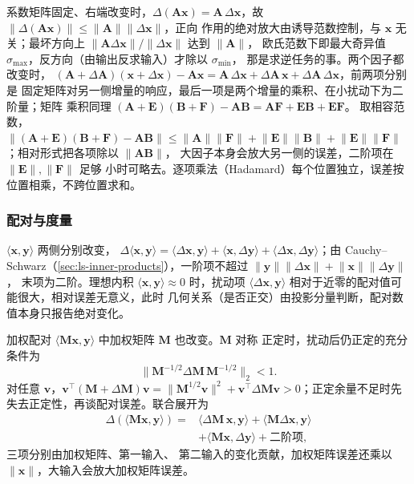 系数矩阵固定、右端改变时，$\Delta(\bm A\bm x)=\bm A\,\Delta\bm x$，故
$\lVert\Delta(\bm A\bm x)\rVert\leq\lVert\bm A\rVert\lVert\Delta\bm x\rVert$，正向
作用的绝对放大由诱导范数控制，与 $\bm x$ 无关；最坏方向上
$\lVert\bm A\Delta\bm x\rVert/\lVert\Delta\bm x\rVert$ 达到 $\lVert\bm A\rVert$，
欧氏范数下即最大奇异值 $\sigma_{\max}$，反方向（由输出反求输入）才除以 $\sigma_{\min}$，
那是求逆任务的事。两个因子都改变时，
$(\bm A+\Delta\bm A)(\bm x+\Delta\bm x)-\bm A\bm x
=\bm A\,\Delta\bm x+\Delta\bm A\,\bm x+\Delta\bm A\,\Delta\bm x$，前两项分别是
固定矩阵对另一侧增量的响应，最后一项是两个增量的乘积、在小扰动下为二阶量；矩阵
乘积同理 $(\bm A+\bm E)(\bm B+\bm F)-\bm A\bm B=\bm A\bm F+\bm E\bm B+\bm E\bm F$。
取相容范数，$\lVert(\bm A+\bm E)(\bm B+\bm F)-\bm A\bm B\rVert
\leq\lVert\bm A\rVert\lVert\bm F\rVert+\lVert\bm E\rVert\lVert\bm B\rVert
+\lVert\bm E\rVert\lVert\bm F\rVert$；相对形式把各项除以 $\lVert\bm A\bm B\rVert$，
大因子本身会放大另一侧的误差，二阶项在 $\lVert\bm E\rVert,\lVert\bm F\rVert$ 足够
小时可略去。逐项乘法（Hadamard）每个位置独立，误差按位置相乘，不跨位置求和。

\subsubsection{配对与度量}

$\langle\bm x,\bm y\rangle$ 两侧分别改变，
$\Delta\langle\bm x,\bm y\rangle=\langle\Delta\bm x,\bm y\rangle
+\langle\bm x,\Delta\bm y\rangle+\langle\Delta\bm x,\Delta\bm y\rangle$；由
Cauchy--Schwarz（\ref{sec:ls-inner-products}），一阶项不超过
$\lVert\bm y\rVert\lVert\Delta\bm x\rVert+\lVert\bm x\rVert\lVert\Delta\bm y\rVert$，
末项为二阶。理想内积 $\langle\bm x,\bm y\rangle\approx0$ 时，扰动项
$\langle\Delta\bm x,\bm y\rangle$ 相对于近零的配对值可能很大，相对误差无意义，此时
几何关系（是否正交）由投影分量判断，配对数值本身只报告绝对变化。

加权配对 $\langle\bm M\bm x,\bm y\rangle$ 中加权矩阵 $\bm M$ 也改变。$\bm M$ 对称
正定时，扰动后仍正定的充分条件为
\begin{equation}
 \lVert\bm M^{-1/2}\Delta\bm M\,\bm M^{-1/2}\rVert_2<1.
\end{equation}
对任意 $\bm v$，$\bm v^\top(\bm M+\Delta\bm M)\bm v
=\lVert\bm M^{1/2}\bm v\rVert^2+\bm v^\top\Delta\bm M\bm v>0$；正定余量不足时先
失去正定性，再谈配对误差。联合展开为
\begin{equation}
 \begin{aligned}
  \Delta(\langle\bm M\bm x,\bm y\rangle)
  ={}&\langle\Delta\bm M\,\bm x,\bm y\rangle
  +\langle\bm M\Delta\bm x,\bm y\rangle\\
  &+\langle\bm M\bm x,\Delta\bm y\rangle+\text{二阶项},
 \end{aligned}
\end{equation}
三项分别由加权矩阵、第一输入、
第二输入的变化贡献，加权矩阵误差还乘以 $\lVert\bm x\rVert$，大输入会放大加权矩阵误差。

